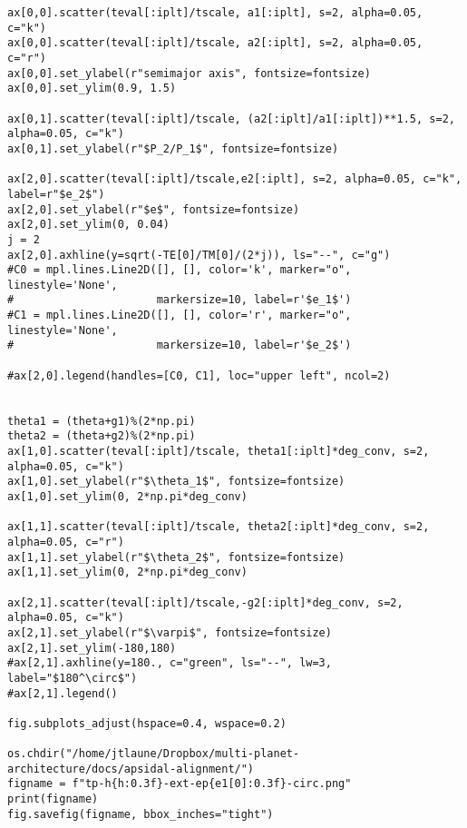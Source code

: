 \documentclass[11pt]{article}
\begin{document}
\begin{verbatim}
ax[0,0].scatter(teval[:iplt]/tscale, a1[:iplt], s=2, alpha=0.05, c="k")
ax[0,0].scatter(teval[:iplt]/tscale, a2[:iplt], s=2, alpha=0.05, c="r")
ax[0,0].set_ylabel(r"semimajor axis", fontsize=fontsize)
ax[0,0].set_ylim(0.9, 1.5)

ax[0,1].scatter(teval[:iplt]/tscale, (a2[:iplt]/a1[:iplt])**1.5, s=2, alpha=0.05, c="k")
ax[0,1].set_ylabel(r"$P_2/P_1$", fontsize=fontsize)

ax[2,0].scatter(teval[:iplt]/tscale,e2[:iplt], s=2, alpha=0.05, c="k", label=r"$e_2$")
ax[2,0].set_ylabel(r"$e$", fontsize=fontsize)
ax[2,0].set_ylim(0, 0.04)
j = 2
ax[2,0].axhline(y=sqrt(-TE[0]/TM[0]/(2*j)), ls="--", c="g")
#C0 = mpl.lines.Line2D([], [], color='k', marker="o", linestyle='None',
#                      markersize=10, label=r'$e_1$')
#C1 = mpl.lines.Line2D([], [], color='r', marker="o", linestyle='None',
#                      markersize=10, label=r'$e_2$')

#ax[2,0].legend(handles=[C0, C1], loc="upper left", ncol=2)


theta1 = (theta+g1)%(2*np.pi)
theta2 = (theta+g2)%(2*np.pi)
ax[1,0].scatter(teval[:iplt]/tscale, theta1[:iplt]*deg_conv, s=2, alpha=0.05, c="k")
ax[1,0].set_ylabel(r"$\theta_1$", fontsize=fontsize)
ax[1,0].set_ylim(0, 2*np.pi*deg_conv)

ax[1,1].scatter(teval[:iplt]/tscale, theta2[:iplt]*deg_conv, s=2, alpha=0.05, c="r")
ax[1,1].set_ylabel(r"$\theta_2$", fontsize=fontsize)
ax[1,1].set_ylim(0, 2*np.pi*deg_conv)

ax[2,1].scatter(teval[:iplt]/tscale,-g2[:iplt]*deg_conv, s=2, alpha=0.05, c="k")
ax[2,1].set_ylabel(r"$\varpi$", fontsize=fontsize)
ax[2,1].set_ylim(-180,180)
#ax[2,1].axhline(y=180., c="green", ls="--", lw=3, label="$180^\circ$")
#ax[2,1].legend()

fig.subplots_adjust(hspace=0.4, wspace=0.2)

os.chdir("/home/jtlaune/Dropbox/multi-planet-architecture/docs/apsidal-alignment/")
figname = f"tp-h{h:0.3f}-ext-ep{e1[0]:0.3f}-circ.png"
print(figname)
fig.savefig(figname, bbox_inches="tight")
\end{verbatim}
\end{document}
